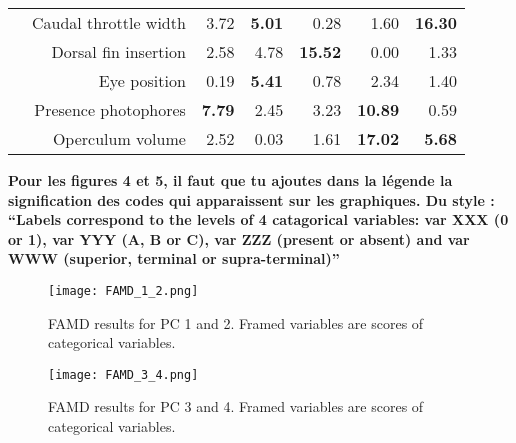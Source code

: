 \begin{table}[!htbp]
\begin{adjustbox}{max width=1.1\textwidth,center}
\begin{tabular}{>{\bfseries}crrrrrr}
  &Caudal throttle width & 3.72 & \textbf{5.01} & 0.28 & 1.60 & \textbf{16.30} \\ 
  &Dorsal fin insertion & 2.58 & 4.78 & \textbf{15.52} & 0.00 & 1.33 \\ 
  \midrule
  \multirow{2}{*}{Habitat} &Eye position & 0.19 & \textbf{5.41} & 0.78 & 2.34 & 1.40 \\ 
  &Presence photophores & \textbf{7.79} & 2.45 & 3.23 & \textbf{10.89} & 0.59 \\
  &Operculum volume & 2.52 & 0.03 & 1.61 & \textbf{17.02} & \textbf{5.68} \\ 
   \bottomrule
\end{tabular}
\end{adjustbox}
\end{table}

\textbf{Pour les figures 4 et 5, il faut que tu ajoutes dans la légende la signification des codes qui apparaissent sur les graphiques. Du style :
``Labels correspond to the levels of 4 catagorical variables: var XXX (0 or 1), var YYY (A, B or C), var ZZZ (present or absent) and var WWW (superior, terminal or supra-terminal)''
}
\begin{figure} [!htbp]
	\begin{center}
		\texttt{[image: FAMD\_1\_2.png]}
	\end{center}
	\caption[FAMD results for first and second axis]{FAMD results for PC 1 and 2. Framed variables are scores of categorical variables.}
	\label{fig:famd12}
\end{figure}

\begin{figure} [!htbp]
	\begin{center}
		\texttt{[image: FAMD\_3\_4.png]}
	\end{center}
	\caption[FAMD results for third and fourth axis]{FAMD results for PC 3 and 4. Framed variables are scores of categorical variables.}
	\label{fig:famd34}
\end{figure}


